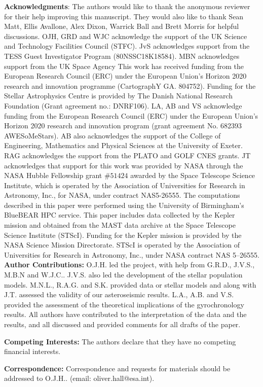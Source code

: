 \documentclass[12pt]{article}
\begin{document}
\newpage
\textbf{Acknowledgments}: The authors would like to thank the anonymous reviewer for their help improving this manuscript. They would also like to thank Sean Matt, Ellis Avallone, Alex Dixon, Warrick Ball and Brett Morris for helpful discussions.
OJH, GRD and WJC acknowledge the support of the UK Science and Technology Facilities Council (STFC). 
JvS acknowledges support from the TESS Guest Investigator Program (80NSSC18K18584).
MBN acknowledges support from the UK Space Agency
This work has received funding from the European Research Council (ERC) under the European Union's Horizon 2020 research and innovation programme (CartographY GA. 804752).
Funding for the Stellar Astrophysics Centre is provided by The Danish National Research Foundation (Grant agreement no.: DNRF106). 
LA, AB and VS acknowledge funding from the European Research Council (ERC) under the European Union's Horizon 2020 research and innovation program (grant agreement No. 682393 AWESoMeStars). AB also acknowledges the support of the College of Engineering, Mathematics and Physical Sciences at the University of Exeter.
RAG acknowledges the support from the PLATO and GOLF CNES grants.
JT acknowledges that support for this work was provided by NASA through the NASA Hubble Fellowship grant $\#51424$ awarded by the Space Telescope Science Institute, which is operated by the Association of Universities for Research in Astronomy, Inc., for NASA, under contract NAS5-26555.
The computations described in this paper were performed using the University of Birmingham's BlueBEAR HPC service.
This paper includes data collected by the Kepler mission and obtained from the MAST data archive at the Space Telescope Science Institute (STScI). Funding for the Kepler mission is provided by the NASA Science Mission Directorate. STScI is operated by the Association of Universities for Research in Astronomy, Inc., under NASA contract NAS 5–26555.\\

\textbf{Author Contributions:} O.J.H. led the project, with help from G.R.D., J.V.S., M.B.N and W.J.C.. J.V.S. also led the development of the stellar population models. M.N.L., R.A.G. and S.K. provided data or stellar models and along with J.T. assessed the validity of our asteroseismic results. L.A., A.B. and V.S. provided the assessment of the theoretical implications of the gyrochronology results. All authors have contributed to the interpretation of the data and the results, and all discussed and provided comments for all drafts of the paper.

\textbf{Competing Interests:} The authors declare that they have no competing financial interests.

\textbf{Correspondence:} Correspondence and requests for materials should be addressed to O.J.H.. (email: oliver.hall@esa.int).\\

\clearpage


\clearpage

\end{document}
